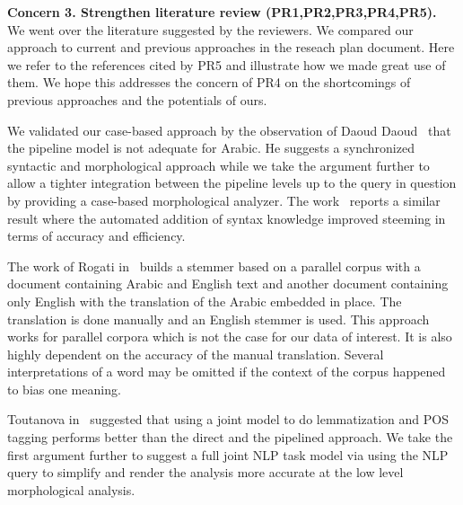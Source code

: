 \documentclass[12pt]{article}
\newcommand{\noTrNoVocRL}[1]{\novocalize\transfalse\RL{#1}\transtrue\vocalize}
\begin{document}
{\bf Concern 3. Strengthen literature review (PR1,PR2,PR3,PR4,PR5).~~}
We went over the literature suggested by the reviewers. 
We compared our approach to current and previous approaches in the
reseach plan document. 
Here we refer to the references cited by PR5 and illustrate how
we made great use of them.
We hope this addresses the concern of PR4 on the shortcomings
of previous approaches and the potentials of ours. 

We validated our case-based approach by the observation of 
Daoud Daoud~\cite{Dao09} that the pipeline model is not 
adequate for Arabic. 
He suggests a synchronized syntactic and morphological
approach while we take the argument further to 
allow a tighter integration between the pipeline
levels up to the query in question by providing a case-based
morphological analyzer. 
The work~\cite{AlSham08} reports a similar result where
the automated addition of syntax knowledge improved steeming
in terms of accuracy and efficiency. 

The work of Rogati in~\cite{Rog03} builds a stemmer based on
a parallel corpus with a document containing Arabic and English
text and another document containing only English with the
translation of the Arabic embedded in place. 
The translation is done manually and an English stemmer is used. 
This approach works for parallel corpora which is not the case
for our data of interest. 
It is also highly dependent on the accuracy of the manual translation.
Several interpretations of a word may be omitted if the context
of the corpus happened to bias one meaning.

Toutanova in~\cite{Tou09} suggested that using 
a joint model to do lemmatization and POS tagging performs better
than the direct and the pipelined approach. 
We take the first argument further to suggest a full joint NLP task 
model via using the NLP query to simplify and render the analysis
more accurate at the low level morphological analysis.
\end{document}
